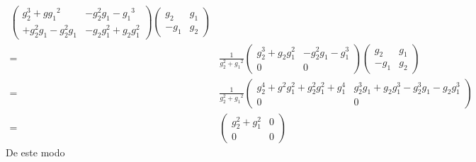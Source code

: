 \begin{frame}
\begin{align}
\begin{pmatrix}
    g_2^3+g{{g_1}}^2 & -g_2^2{g_1}-{{g_1}}^3\\
+g_2^2{g_1}-g_2^2{g_1}    &-g_2 g_1^2+g_2 g_1^2
  \end{pmatrix}
\begin{pmatrix}
    g_2   & {g_1}\\
    -{g_1} & g_2
  \end{pmatrix}\nonumber\\
=&\frac{1}{g_2^2+{{g_1}}^2}
  \begin{pmatrix}
    g_2^3+g_2 g_1^2 & -g_2^2{g_1}-g_1^3\\
    0   &0
  \end{pmatrix}
\begin{pmatrix}
    g_2   & {g_1}\\
    -{g_1} & g_2
  \end{pmatrix}\nonumber\\
=&\frac{1}{g_2^2+{{g_1}}^2}
  \begin{pmatrix}
    g_2^4+g^2 g_1^2+g_2^2 g_1^2+g_1^4 & g_2^3{g_1}+g_2 g_1^3-g_2^3{g_1}-g_2 g_1^3\\
    0    &0
  \end{pmatrix}\nonumber\\
=&\begin{pmatrix}
    g_2^2+g_1^2 & 0\\
    0    &0
  \end{pmatrix}
\end{align}
De este modo


\end{frame}

